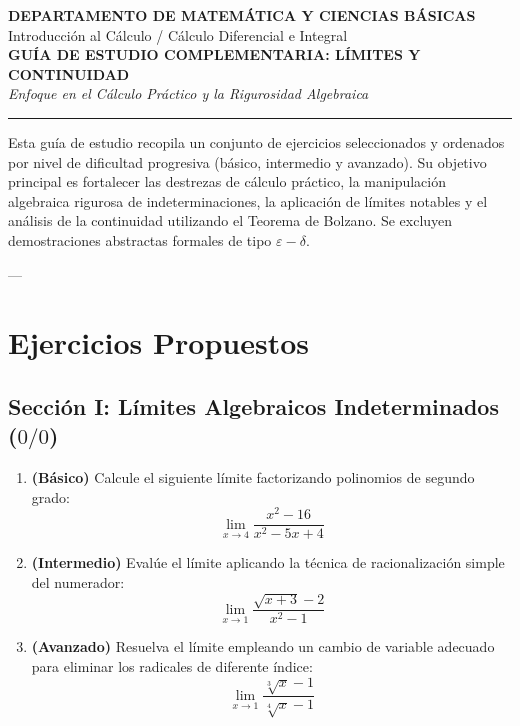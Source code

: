 \documentclass[11pt,letterpaper]{article}
\begin{document}
\begin{center}
    {\large \textbf{DEPARTAMENTO DE MATEMÁTICA Y CIENCIAS BÁSICAS}} \\
    {\small Introducción al Cálculo / Cálculo Diferencial e Integral} \\
    \vspace{0.3cm}
    {\Large \textbf{GUÍA DE ESTUDIO COMPLEMENTARIA: LÍMITES Y CONTINUIDAD}} \\
    {\small \textit{Enfoque en el Cálculo Práctico y la Rigurosidad Algebraica}} \\
    \vspace{0.2cm}
    \rule{\textwidth}{0.8pt}
\end{center}

\vspace{0.3cm}
Esta guía de estudio recopila un conjunto de ejercicios seleccionados y ordenados por nivel de dificultad progresiva (básico, intermedio y avanzado). Su objetivo principal es fortalecer las destrezas de cálculo práctico, la manipulación algebraica rigurosa de indeterminaciones, la aplicación de límites notables y el análisis de la continuidad utilizando el Teorema de Bolzano. Se excluyen demostraciones abstractas formales de tipo $\varepsilon-\delta$.

---

\section{Ejercicios Propuestos}

\subsection{Sección I: Límites Algebraicos Indeterminados ($0/0$)}
\begin{enumerate}[label=\textbf{\arabic*.}]
    \item \textbf{(Básico)} Calcule el siguiente límite factorizando polinomios de segundo grado:
    $$\lim_{x\to 4} \frac{x^2 - 16}{x^2 - 5x + 4}$$
    
    \item \textbf{(Intermedio)} Evalúe el límite aplicando la técnica de racionalización simple del numerador:
    $$\lim_{x\to 1} \frac{\sqrt{x+3} - 2}{x^2 - 1}$$
    
    \item \textbf{(Avanzado)} Resuelva el límite empleando un cambio de variable adecuado para eliminar los radicales de diferente índice:
    $$\lim_{x\to 1} \frac{\sqrt[3]{x} - 1}{\sqrt[4]{x} - 1}$$
\end{enumerate}
\end{document}
